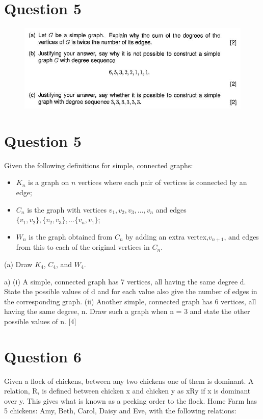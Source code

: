 \documentclass[12pt]{article} %
\begin{document}
\section*{Question 5}

\begin{figure}
\centering
\includegraphics[width=0.7\linewidth]{GraphTheoryQuestion2012}

\end{figure}

\section*{Question 5}
Given the following definitions for simple, connected graphs:
\begin{itemize}
	\item $K_n$ is a graph on $n$ vertices where each pair of vertices is connected by an edge;
	\item $C_n$ is the graph with vertices $v_1, v_2, v_3, \dots, v_n$ and edges $\{v_1,v_2\}, \{v_2,v_3\}, \dots\{v_n, v_1\}$;
	\item $W_n$ is the graph obtained from $C_n$ by adding an extra vertex,$v_{n+1}$, and edges
	from this to each of the original vertices in $C_n$.
\end{itemize}
(a) Draw $K_4$, $C_4$, and $W_4$. 

a) (i) A simple, connected graph has 7 vertices, all having the same degree d.
State the possible values of d and for each value also give the number of edges
in the corresponding graph.
(ii) Another simple, connected graph has 6 vertices, all having the same degree,
n. Draw such a graph when n = 3 and state the other possible values of n.
[4]
\newpage
\section*{Question 6}
Given a flock of chickens, between any two chickens one of them is
dominant. A relation, R, is defined between chicken x and chicken y as xRy if x is
dominant over y. This gives what is known as a pecking order to the flock. Home
Farm has 5 chickens: Amy, Beth, Carol, Daisy and Eve, with the following relations:
\end{document}
